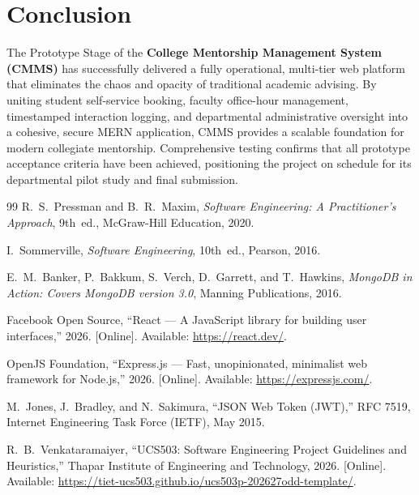 \documentclass[11pt,a4paper]{article}
\begin{document}
\section{Conclusion}
The Prototype Stage of the \textbf{College Mentorship Management System (CMMS)} has successfully delivered a fully operational, multi-tier web platform that eliminates the chaos and opacity of traditional academic advising. By uniting student self-service booking, faculty office-hour management, timestamped interaction logging, and departmental administrative oversight into a cohesive, secure MERN application, CMMS provides a scalable foundation for modern collegiate mentorship. Comprehensive testing confirms that all prototype acceptance criteria have been achieved, positioning the project on schedule for its departmental pilot study and final submission.

\begin{thebibliography}{99}
R.~S.~Pressman and B.~R.~Maxim, \emph{Software Engineering: A Practitioner's Approach}, 9th~ed., McGraw-Hill Education, 2020.

I.~Sommerville, \emph{Software Engineering}, 10th~ed., Pearson, 2016.

E.~M.~Banker, P.~Bakkum, S.~Verch, D.~Garrett, and T.~Hawkins, \emph{MongoDB in Action: Covers MongoDB version 3.0}, Manning Publications, 2016.

Facebook Open Source, ``React --- A JavaScript library for building user interfaces,'' 2026. [Online]. Available: \url{https://react.dev/}.

OpenJS Foundation, ``Express.js --- Fast, unopinionated, minimalist web framework for Node.js,'' 2026. [Online]. Available: \url{https://expressjs.com/}.

M.~Jones, J.~Bradley, and N.~Sakimura, ``JSON Web Token (JWT),'' RFC 7519, Internet Engineering Task Force (IETF), May 2015.

R.~B.~Venkataramaiyer, ``UCS503: Software Engineering Project Guidelines and Heuristics,'' Thapar Institute of Engineering and Technology, 2026. [Online]. Available: \url{https://tiet-ucs503.github.io/ucs503p-202627odd-template/}.
\end{thebibliography}
\end{document}
